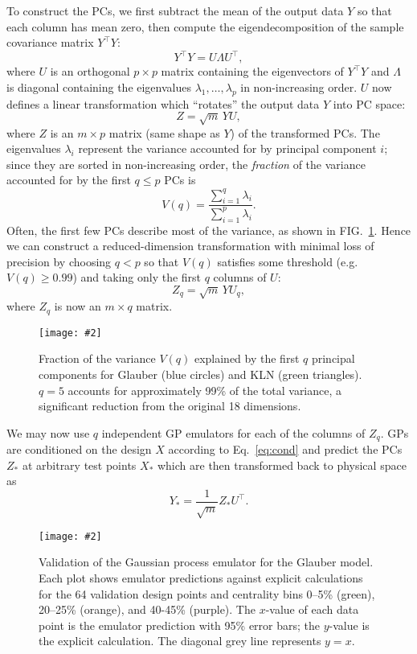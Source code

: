\documentclass[aps,prc,reprint,superscriptaddress,amsmath]{revtex4-1}
\newcommand{\colfig}[3][t]{
  \begin{figure}[#1]
    \texttt{[image: \#2]}
    \caption{\label{fig:#2}#3}
  \end{figure}
}
\newcommand{\widefig}[3][t]{
  \begin{figure*}[#1]
    \texttt{[image: \#2]}
    \caption{\label{fig:#2}#3}
  \end{figure*}
}
\newcommand{\tran}{^\intercal}
\begin{document}
To construct the PCs, we first subtract the mean of the output data $Y$ so that each column has mean zero, then compute the eigendecomposition of the sample covariance matrix $Y\tran Y$:
\begin{equation}
  Y\tran Y = U \Lambda U\tran,
  \label{eq:cov}
\end{equation}
where $U$ is an orthogonal $p \times p$ matrix containing the eigenvectors of $Y\tran Y$ and $\Lambda$ is diagonal containing the eigenvalues $\lambda_1, \ldots, \lambda_p$ in non-increasing order.
$U$ now defines a linear transformation which ``rotates'' the output data $Y$ into PC space:
\begin{equation}
  Z = \sqrt m \, YU,
\end{equation}
where $Z$ is an $m \times p$ matrix (same shape as $Y$) of the transformed PCs.
The eigenvalues $\lambda_i$ represent the variance accounted for by principal component $i$; since they are sorted in non-increasing order, the \emph{fraction} of the variance accounted for by the first $q \leq p$ PCs is
\begin{equation}
  V(q) = \frac{\sum_{i=1}^q \lambda_i}{\sum_{i=1}^p \lambda_i}.
\end{equation}
Often, the first few PCs describe most of the variance, as shown in FIG.~\ref{fig:pc_var}.
Hence we can construct a reduced-dimension transformation with minimal loss of precision by choosing $q < p$ so that $V(q)$ satisfies some threshold (e.g.~$V(q) \geq 0.99$) and taking only the first $q$ columns of $U$:
\begin{equation}
  Z_q = \sqrt m \, YU_q,
\end{equation}
where $Z_q$ is now an $m \times q$ matrix.

\colfig{pc_var}{
  Fraction of the variance $V(q)$ explained by the first $q$ principal components for Glauber (blue circles) and KLN (green triangles).
  $q = 5$ accounts for approximately 99\% of the total variance, a significant reduction from the original 18 dimensions.
}

We may now use $q$ independent GP emulators for each of the columns of $Z_q$.
GPs are conditioned on the design $X$ according to Eq.~\eqref{eq:cond} and predict the PCs $Z_*$ at arbitrary test points $X_*$ which are then transformed back to physical space as
\begin{equation}
  Y_* = \frac{1}{\sqrt m} Z_* U\tran.
\end{equation}

\widefig{validation}{
  Validation of the Gaussian process emulator for the Glauber model.
  Each plot shows emulator predictions against explicit calculations for the 64 validation design points and centrality bins 0--5\% (green), 20--25\% (orange), and 40-45\% (purple).
  The $x$-value of each data point is the emulator prediction with 95\% error bars; the $y$-value is the explicit calculation.
  The diagonal grey line represents $y = x$.
}
\end{document}
